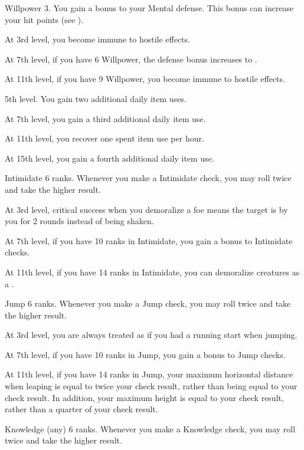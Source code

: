     \featpre Willpower 3.
    \featben You gain a  bonus to your Mental defense.
    This bonus can increase your hit points (see ).

    At 3rd level, you become immune to hostile  effects.

    At 7th level, if you have 6 Willpower, the defense bonus increases to .

    At 11th level, if you have 9 Willpower, you become immune to hostile  effects.

    \featpre 5th level.
    \featben You gain two additional daily item uses.

    At 7th level, you gain a third additional daily item use.

    At 11th level, you recover one spent item use per hour.

    At 15th level, you gain a fourth additional daily item use.

    \featpre Intimidate 6 ranks.
    \featben Whenever you make a Intimidate check, you may roll twice and take the higher result.

    At 3rd level, critical success when you demoralize a foe means the target is \frightened by you for 2 rounds instead of being shaken.

    At 7th level, if you have 10 ranks in Intimidate, you gain a  bonus to Intimidate checks.

    At 11th level, if you have 14 ranks in Intimidate, you can demoralize creatures as a .

    \featpre Jump 6 ranks.
    \featben Whenever you make a Jump check, you may roll twice and take the higher result.

    At 3rd level, you are always treated as if you had a running start when jumping.

    At 7th level, if you have 10 ranks in Jump, you gain a  bonus to Jump checks.

    At 11th level, if you have 14 ranks in Jump, your maximum horizontal distance when leaping is equal to twice your check result, rather than being equal to your check result.
    In addition, your maximum height is equal to your check result, rather than a quarter of your check result.

    \featpre Knowledge (any) 6 ranks.
    \featben Whenever you make a Knowledge check, you may roll twice and take the higher result.

